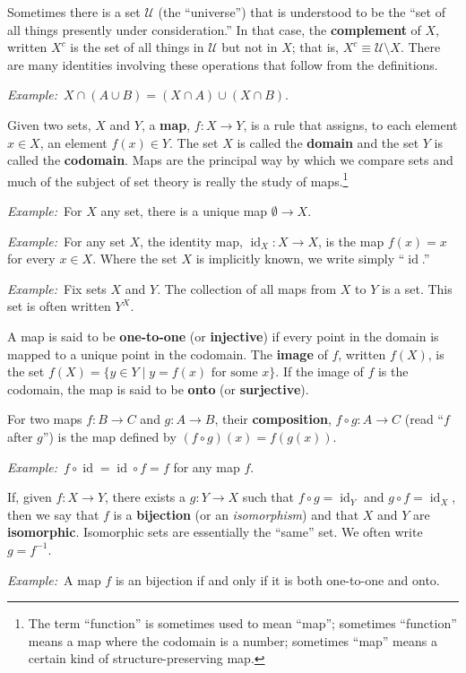 \documentclass[10pt, a4paper, twocolumn]{article}
\newcommand{\defn}[1]{\textbf{\textsf{#1}}}
\newcommand{\eg}{\emph{Example:}\relax}
\DeclareMathOperator{\id}{id}
\begin{document}
Sometimes there is a set $\mathcal{U}$ (the ``universe'') that is understood to
be the “set of all things presently under consideration.” In that
case, the \defn{complement} of $X$, written $X^c$ is the set of all
things in $\mathcal{U}$ but not in $X$; that is, $X^c \equiv \mathcal{U} \setminus X$. There are many
identities involving these operations that follow from the
definitions.

\eg\ $X\cap(A\cup B) = (X\cap A)\cup (X\cap B)$.

Given two sets, $X$ and $Y$, a \defn{map}, $f : X \to Y$, is a rule that
assigns, to each element $x \in X$, an element $f(x) \in Y$. The set $X$
is called the \defn{domain} and the set $Y$ is called the
\defn{codomain}. Maps are the principal way by which we compare sets
and much of the subject of set theory is really the study of
maps.\footnote{The term “function” is sometimes used to mean “map”;
sometimes “function” means a map where the codomain is a number;
sometimes “map” means a certain kind of structure-preserving map.}

\eg\ For $X$ any set, there is a unique map $\emptyset \to X$.

\eg\ For any set $X$, the identity map, $\id_X : X \to X$, is the map
$f(x) = x$ for every $x\in X$. Where the set $X$ is implicitly known, we
write simply “$\id$.”

\eg\ Fix sets $X$ and $Y$. The collection of all maps from $X$ to $Y$
is a set. This set is often written $Y^X$. 

A map is said to be \defn{one-to-one} (or \defn{injective}) if every
point in the domain is mapped to a unique point in the codomain. The
\defn{image} of $f$, written $f(X)$, is the set $f(X) = \{y \in Y \mid
\text{$y = f(x)$ for some $x$}\}$. If the image of $f$ is the
codomain, the map is said to be \defn{onto} (or \defn{surjective}).

For two maps $f:B \to C$ and $g:A \to B$, their \defn{composition}, $f\circ g: A \to C$
(read “$f$ after $g$”) is the map defined by $(f\circ g)(x) = f(g(x))$.

\eg\ $f\circ\id = \id\circ f = f$ for any map $f$. 

If, given $f:X \to Y$, there exists a $g:Y \to X$ such that $f\circ g = \id_Y$
and $g\circ f = \id_X$, then we say that $f$ is a \defn{bijection} (or an
\emph{isomorphism}) and that $X$ and $Y$ are
\defn{isomorphic}. Isomorphic sets are essentially the ``same''
set. We often write $g = f^{-1}$.

\eg\ A map $f$ is an bijection if and only if it is both one-to-one
and onto.
\end{document}

